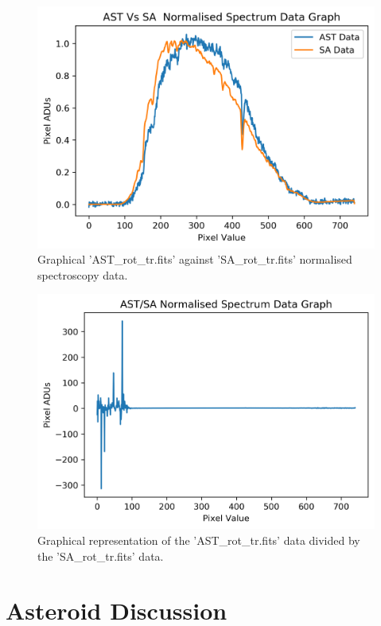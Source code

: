 \documentclass[12pt]{article}
\begin{document}
\newpage
\begin{figure}[H]
  \centering
  \includegraphics[scale=1.0]{Images/AsImages/S4/SC/ASTVsSAPythonGraph.png}
  \caption{\label{AST Vs SA Cor Python Graph} Graphical 'AST\_rot\_tr.fits' against 'SA\_rot\_tr.fits' normalised spectroscopy data.}
\end{figure}
\begin{figure}[H]
  \centering
  \includegraphics[scale=1.0]{Images/AsImages/S4/SC/AST-SAPythonGraph.png}
  \caption{\label{AST/SA Cor Graph} Graphical representation of the 'AST\_rot\_tr.fits' data divided by the 'SA\_rot\_tr.fits' data.}
\end{figure}

\section{Asteroid Discussion}
\label{Section 5}
\end{document}
